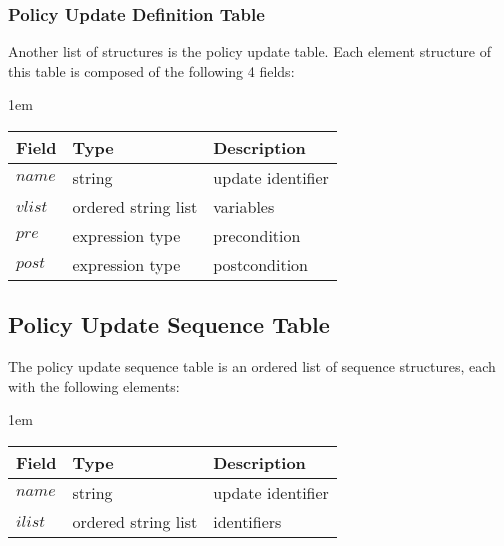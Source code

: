 \documentclass[11pt, twocolumn]{article}
\newenvironment{vquote}
  {\begin{list}{}{\leftmargin 1em}\item[]}
  {\end{list}}
\begin{document}
      \subsubsection{Policy Update Definition Table}

        Another list of structures is the policy update table. Each element
        structure of this table is composed of the following 4 fields:

        \begin{vquote}
          \begin{tabular}[t]{|l|l|l|}
            \hline
            \textbf{Field} & \textbf{Type} & \textbf{Description} \\
            \hline
            $name$ & string & update identifier \\
            \hline
            $vlist$ & ordered string list & variables \\
            \hline
            $pre$ & expression type & precondition \\
            \hline
            $post$ & expression type & postcondition \\
            \hline
          \end{tabular}
        \end{vquote}

    \subsection{Policy Update Sequence Table}

      The policy update sequence table is an ordered list of sequence
      structures, each with the following elements:

      \begin{vquote}
        \begin{tabular}[t]{|l|l|l|}
          \hline
          \textbf{Field} & \textbf{Type} & \textbf{Description} \\
          \hline
          $name$ & string & update identifier \\
          \hline
          $ilist$ & ordered string list & identifiers \\
          \hline
        \end{tabular}
      \end{vquote}
\end{document}
